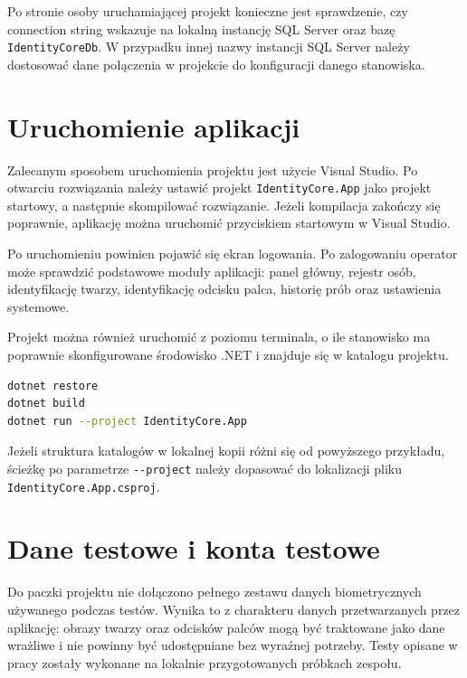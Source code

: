 Po stronie osoby uruchamiającej projekt konieczne jest sprawdzenie, czy connection string wskazuje na lokalną instancję SQL Server oraz bazę \texttt{IdentityCoreDb}. W przypadku innej nazwy instancji SQL Server należy dostosować dane połączenia w projekcie do konfiguracji danego stanowiska.

\section{Uruchomienie aplikacji}

Zalecanym sposobem uruchomienia projektu jest użycie Visual Studio. Po otwarciu rozwiązania należy ustawić projekt \texttt{IdentityCore.App} jako projekt startowy, a następnie skompilować rozwiązanie. Jeżeli kompilacja zakończy się poprawnie, aplikację można uruchomić przyciskiem startowym w Visual Studio.

Po uruchomieniu powinien pojawić się ekran logowania. Po zalogowaniu operator może sprawdzić podstawowe moduły aplikacji: panel główny, rejestr osób, identyfikację twarzy, identyfikację odcisku palca, historię prób oraz ustawienia systemowe.

Projekt można również uruchomić z poziomu terminala, o ile stanowisko ma poprawnie skonfigurowane środowisko .NET i znajduje się w katalogu projektu.

\begin{lstlisting}[language=bash, caption={Przykładowe uruchomienie aplikacji z poziomu katalogu projektu}, label={lst:dotnet-run}]
dotnet restore
dotnet build
dotnet run --project IdentityCore.App
\end{lstlisting}

Jeżeli struktura katalogów w lokalnej kopii różni się od powyższego przykładu, ścieżkę po parametrze \texttt{-{}-project} należy dopasować do lokalizacji pliku \texttt{IdentityCore.App.csproj}.

\section{Dane testowe i konta testowe}

Do paczki projektu nie dołączono pełnego zestawu danych biometrycznych używanego podczas testów. Wynika to z charakteru danych przetwarzanych przez aplikację: obrazy twarzy oraz odcisków palców mogą być traktowane jako dane wrażliwe i nie powinny być udostępniane bez wyraźnej potrzeby. Testy opisane w pracy zostały wykonane na lokalnie przygotowanych próbkach zespołu.

